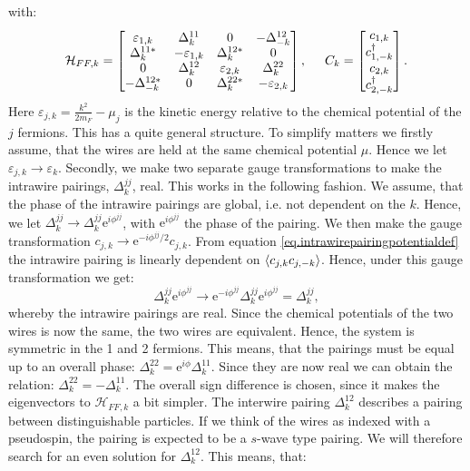 with:
\begin{equation}
\mathcal{H}_{FF,k} = \begin{bmatrix} \varepsilon_{1,k} & \Delta^{11}_k      & 0                 & -\Delta^{12}_{-k} \\ 
                                     \Delta^{11 *}_k   & -\varepsilon_{1,k} & \Delta^{12*}_k    & 0 \\ 
                                    0                  & \Delta^{12}_k      & \varepsilon_{2,k} & \Delta^{22}_k \\ 
                                     -\Delta^{12*}_{-k}& 0                  & \Delta^{22*}_k    & -\varepsilon_{2,k} \end{bmatrix}, \hspace{0.5cm}
C_k =  \begin{bmatrix} c_{1,k} \\ c^\dagger_{1,-k} \\ c_{2,k} \\ c^\dagger_{2,-k} \end{bmatrix}.                                     
\end{equation}
Here $\varepsilon_{j,k} = \frac{k^2}{2m_F}-\mu_j$ is the kinetic energy relative to the chemical potential of the $j$ fermions. This has a quite general structure. To simplify matters we firstly assume, that the wires are held at the same chemical potential $\mu$. Hence we let $\varepsilon_{j,k} \to \varepsilon_k$. Secondly, we make two separate gauge transformations to make the intrawire pairings, $\Delta^{jj}_k$, real. This works in the following fashion. We assume, that the phase of the intrawire pairings are global, i.e. not dependent on the $k$. Hence, we let $\Delta^{jj}_k \to \Delta^{jj}_k \text{e}^{i\phi^{jj}}$, with $\text{e}^{i\phi^{jj}}$ the phase of the pairing. We then make the gauge transformation $c_{j,k} \to \text{e}^{-i\phi^{jj}/2}c_{j,k}$. From equation \eqref{eq.intrawirepairingpotentialdef} the intrawire pairing is linearly dependent on $\braket{c_{j,k}c_{j,-k}}$. Hence, under this gauge transformation we get:
\begin{equation}
\Delta^{jj}_k \text{e}^{i\phi^{jj}} \to \text{e}^{-i\phi^{jj}}\Delta^{jj}_k \text{e}^{i\phi^{jj}} = \Delta^{jj}_k, \nonumber
\end{equation}
whereby the intrawire pairings are real. Since the chemical potentials of the two wires is now the same, the two wires are equivalent. Hence, the system is symmetric in the 1 and 2 fermions. This means, that the pairings must be equal up to an overall phase: $\Delta^{22}_k = \text{e}^{i\phi} \Delta^{11}_k$. Since they are now real we can obtain the relation: $\Delta^{22}_k = -\Delta^{11}_k$. The overall sign difference is chosen, since it makes the eigenvectors to $\mathcal{H}_{FF,k}$ a bit simpler. The interwire pairing $\Delta^{12}_k$ describes a pairing between distinguishable particles. If we think of the wires as indexed with a pseudospin, the pairing is expected to be a $s$-wave type pairing. We will therefore search for an even solution for $\Delta^{12}_k$. This means, that:
